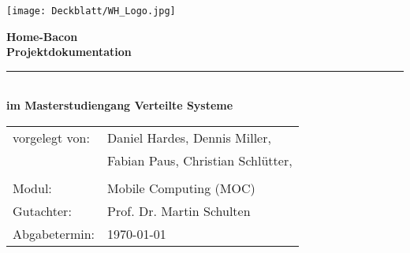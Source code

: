 \thispagestyle{plain}
\begin{titlepage}

\begin{center}

\texttt{[image: Deckblatt/WH\_Logo.jpg]}

\vspace{2cm}

\Huge{\textbf{Home-Bacon}}\\[1.5ex]
\Large{\textbf{Projektdokumentation}}
\rule{\textwidth}{0.4pt}\\[3.0ex]

\large{\textbf{im Masterstudiengang Verteilte Systeme}}\\[3.0ex]

\normalsize
\begin{tabular}{ll}\\
	vorgelegt von: 
	& \quad Daniel Hardes,  Dennis Miller, \\[1.2ex]
	& \quad Fabian Paus, Christian Schlütter,\\[1.2ex]
	& \quad \\[1.2ex]
	Modul:  & \quad Mobile Computing (MOC) \\[1.2ex]
	Gutachter:  & \quad Prof. Dr. Martin Schulten \\[1.2ex]
	Abgabetermin:  & \quad \today\\[1.2ex]
\end{tabular}

\end{center}

\end{titlepage}
